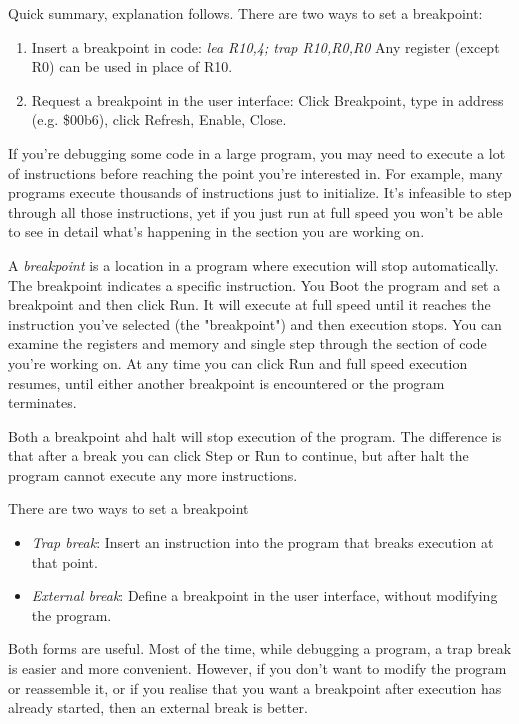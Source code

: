 \documentclass[11pt]{article}
\begin{document}
\begin{itemize}
Quick summary, explanation follows.  There are two ways to set a
breakpoint:

\begin{enumerate}
\item Insert a breakpoint in code: \emph{lea  R10,4; trap R10,R0,R0}  Any
register (except R0) can be used in place of R10.
\item Request a breakpoint in the user interface: Click Breakpoint, type
in address (e.g. \$00b6), click Refresh, Enable, Close.
\end{enumerate}

If you're debugging some code in a large program, you may need to
execute a lot of instructions before reaching the point you're
interested in.  For example, many programs execute thousands of
instructions just to initialize.  It's infeasible to step through all
those instructions, yet if you just run at full speed you won't be
able to see in detail what's happening in the section you are working
on.

A \emph{breakpoint} is a location in a program where execution will stop
automatically.  The breakpoint indicates a specific instruction.  You
Boot the program and set a breakpoint and then click Run.  It will
execute at full speed until it reaches the instruction you've selected
(the "breakpoint") and then execution stops.  You can examine the
registers and memory and single step through the section of code
you're working on.  At any time you can click Run and full speed
execution resumes, until either another breakpoint is encountered or
the program terminates.

Both a breakpoint ahd halt will stop execution of the program.  The
difference is that after a break you can click Step or Run to
continue, but after halt the program cannot execute any more
instructions.

There are two ways to set a breakpoint

\begin{itemize}
\item \emph{Trap break}: Insert an instruction into the program that breaks
execution at that point.
\item \emph{External break}: Define a breakpoint in the user interface, without
modifying the program.
\end{itemize}

Both forms are useful.  Most of the time, while debugging a program, a
trap break is easier and more convenient.  However, if you don't want
to modify the program or reassemble it, or if you realise that you
want a breakpoint after execution has already started, then an
external break is better.


\end{itemize}
\end{document}
